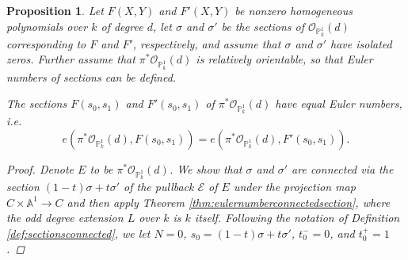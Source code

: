 \documentclass[12pt, reqno]{amsart}
\newtheorem{proposition}[theorem]{Proposition}
\theoremstyle{definition}
\begin{document}
\begin{proposition} \label{proposition:eulernumberpoly}
Let $F(X,Y)$ and $F'(X,Y)$ be nonzero homogeneous polynomials over $k$ of degree $d$, let $\sigma$ and $\sigma'$ be the sections of $\mathscr{O}_{\mathbb{P}^1_k}(d)$ corresponding to $F$ and $F'$, respectively, and assume that $\sigma$ and $\sigma'$ have isolated zeros. Further assume that $\pi^*\mathscr{O}_{\mathbb{P}^1_k}(d)$ is relatively orientable, so that Euler numbers of sections can be defined. \par
The sections $F(s_0,s_1)$ and $F'(s_0,s_1)$ of $\pi^*\mathscr{O}_{\mathbb{P}^1_k}(d)$ have equal Euler numbers, i.e.~
$$e(\pi^* \mathscr{O}_{\mathbb{P}^1_k}(d), F(s_0,s_1)) = e(\pi^* \mathscr{O}_{\mathbb{P}^1_k}(d), F'(s_0,s_1)).$$
\begin{proof}
Denote $E$ to be $\pi^*\mathscr{O}_{\mathbb{P}^1_k}(d)$. We show that $\sigma$ and $\sigma'$ are connected via the section $(1-t) \sigma + t\sigma'$ of the pullback $\mathcal{E}$ of $E$ under the projection map $C \times \mathbb{A}^1 \rightarrow C$ and then apply Theorem \ref{thm:eulernumberconnectedsection}, where the odd degree extension $L$ over $k$ is $k$ itself. Following the notation of Definition \ref{def:sectionsconnected}, we let $N = 0$, $s_0 = (1-t) \sigma + t\sigma'$, $t_0^- = 0$, and $t_0^+ = 1$. \par


\end{proof}
\end{proposition}
\end{document}
